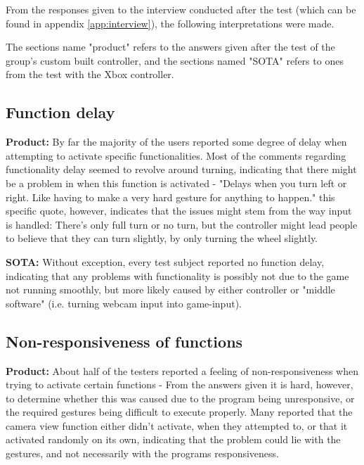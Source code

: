 From the responses given to the interview conducted after the test (which can be found in appendix \ref{app:interview}), the following interpretations were made.

The sections name "product" refers to the answers given after the test of the group's custom built controller, and the sections named "SOTA" refers to ones from the test with the Xbox controller.

\subsection*{Function delay}
\noindent\textbf{Product: }\newline
By far the majority of the users reported some degree of delay when attempting to activate specific functionalities. Most of the comments regarding functionality delay seemed to revolve around turning, indicating that there might be a problem in when this function is activated - "Delays when you turn left or right. Like having to make a very hard gesture for anything to happen." this specific quote, however, indicates that the issues might stem from the way input is handled: There's only full turn or no turn, but the controller might lead people to believe that they can turn slightly, by only turning the wheel slightly.
\bigskip

\noindent\textbf{SOTA:}\newline
Without exception, every test subject reported no function delay, indicating that any problems with functionality is possibly not due to the game not running smoothly, but more likely caused by either controller or "middle software" (i.e. turning webcam input into game-input).


\subsection*{Non-responsiveness of functions}
\noindent\textbf{Product: }\newline
About half of the testers reported a feeling of non-responsiveness when trying to activate certain functions - From the answers given it is hard, however, to determine whether this was caused due to the program being unresponsive, or the required gestures being difficult to execute properly. Many reported that the camera view function either didn't activate, when they attempted to, or that it activated randomly on its own, indicating that the problem could lie with the gestures, and not necessarily with the programs responsiveness.
\bigskip

